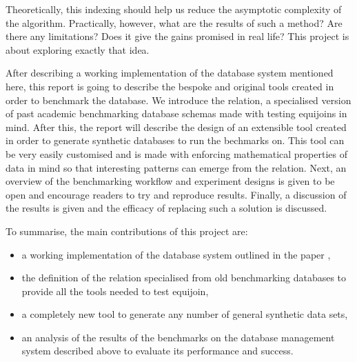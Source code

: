 Theoretically, this indexing should help us reduce the asymptotic complexity of
the algorithm. Practically, however, what are the results of such a method? Are
there any limitations? Does it give the gains promised  in real life? This
project is about exploring exactly that idea.

After describing a working implementation of the database system mentioned here,
this report is going to describe the bespoke and original tools created in order
to benchmark the database. We introduce the  relation, a
specialised version of past academic benchmarking database schemas made with
testing equijoins in mind. After this, the report will describe the design of
an extensible tool created in order to generate synthetic databases to run the
bechmarks on. This tool can be very easily customised and is made with enforcing
mathematical properties of data in mind so that interesting patterns can emerge
from the  relation. Next, an overview of the benchmarking
workflow and experiment designs is given to be open and encourage readers to try
and reproduce results. Finally, a discussion of the results is given and the
efficacy of replacing such a solution is discussed.

To summarise, the main contributions of this project are:
\begin{itemize}
    \item a working implementation of the database system outlined in the paper
        \relalg{},
    \item the definition of the  relation specialised from
        old benchmarking databases to provide all the tools needed to test
        equijoin,
    \item a completely new tool to generate any number of general synthetic data
        sets,
    \item an analysis of the results of the benchmarks on the database
        management system described above to evaluate its performance and
        success.
\end{itemize}
